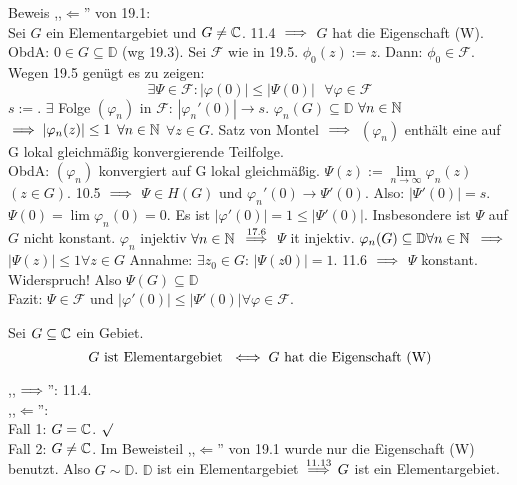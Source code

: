 \documentclass[a4paper,twoside,DIV15,BCOR12mm]{scrbook}
\def\MdD{\mathbb{D}}
\begin{document}
\begin{beweis}
  Beweis ,,$\Longleftarrow$'' von 19.1:\\
  Sei $G$ ein Elementargebiet und $G\ne\mathbb{C}$. 11.4 $\implies$ $G$ hat die Eigenschaft (W).\\
  ObdA: $0\in G\subseteq \MdD$ (wg 19.3). Sei $\mathcal{F}$ wie in 19.5. $\phi_0(z):=z$. Dann: $\phi_0\in\mathcal{F}$. Wegen 19.5 gen\"ugt es zu zeigen: \\
  $$\exists\Psi\in\mathcal{F}:|\varphi(0)|\le|\Psi(0)|\text{ }\forall \varphi\in\mathcal{F}$$
  $s:=$. $\exists$ Folge $(\varphi_n)$  in $\mathcal{F}$: $|\varphi_n'(0)|\to s$. $\varphi_n(G)\subseteq\MdD$ $\forall n\in\mathbb{N}$ \\
  $\implies |\varphi_n(z)|\le 1$ $\forall n\in\mathbb{N}$ $\forall z\in G$. Satz von Montel $\implies$ $(\varphi_n)$ enth\"alt eine auf G lokal gleichm\"a{\ss}ig konvergierende Teilfolge. \\
  ObdA: $(\varphi_n)$ konvergiert auf G lokal gleichm\"a{\ss}ig. $\Psi(z):=\lim\limits_{n\to\infty}\varphi_n(z)$ $(z\in G)$. 10.5 $\implies$ $\Psi \in H(G)$ 
  und $\varphi_n'(0) \to \Psi'(0)$. Also: $|\Psi'(0)|=s$. $\Psi(0)=\lim \varphi_n(0)=0$. Es ist $|\varphi'(0)|=1\le|\Psi'(0)|$.
  Insbesondere ist $\Psi$ auf $G$ nicht konstant. $\varphi_n$ injektiv $\forall n\in\mathbb{N}$ $\stackrel{\text{17.6}}{\implies}$ $\Psi$ it injektiv. $\varphi_n(G) \subseteq \MdD \forall\natn$
  $\implies$ $|\Psi(z)|\le1\forall z\in G$ Annahme: $\exists z_0 \in G$: $|\Psi(z0)| = 1$. 11.6 $\implies$ $\Psi$ konstant. Widerspruch! Also $\Psi(G)\subseteq\MdD$\\
  Fazit: $\Psi \in \mathcal{F}$ und $|\varphi'(0)|\le |\Psi'(0)| \forall \varphi\in\mathcal{F}$.
\end{beweis}
\begin{satz}
  Sei $G\subseteq\mathbb{C}$ ein Gebiet.\\
  $$ G\text{ ist Elementargebiet } \iff G \text{ hat die Eigenschaft (W)}$$
\end{satz}
\begin{beweis}
  ,,$\implies$'': 11.4.\\
  ,,$\Longleftarrow$'':\\
  Fall 1: $G=\mathbb{C}$. $\surd$ \\
  Fall 2: $G\ne\mathbb{C}$. Im Beweisteil ,,$\Longleftarrow$'' von 19.1 wurde nur die Eigenschaft (W) benutzt. Also $G\sim\MdD$. $\MdD$ ist ein Elementargebiet $\stackrel{\text{11.13}}{\implies} G$ ist ein Elementargebiet.
\end{beweis}
\end{document}
